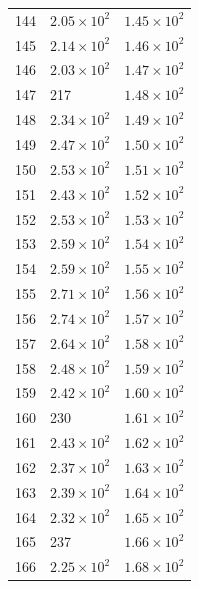 \begin{table}[H]
\begin{tabular}{lll}
144 & $\displaystyle 2.05 \times 10^{2}$ & $\displaystyle 1.45 \times 10^{2}$ \\
145 & $\displaystyle 2.14 \times 10^{2}$ & $\displaystyle 1.46 \times 10^{2}$ \\
146 & $\displaystyle 2.03 \times 10^{2}$ & $\displaystyle 1.47 \times 10^{2}$ \\
147 & 217 & $\displaystyle 1.48 \times 10^{2}$ \\
148 & $\displaystyle 2.34 \times 10^{2}$ & $\displaystyle 1.49 \times 10^{2}$ \\
149 & $\displaystyle 2.47 \times 10^{2}$ & $\displaystyle 1.50 \times 10^{2}$ \\
150 & $\displaystyle 2.53 \times 10^{2}$ & $\displaystyle 1.51 \times 10^{2}$ \\
151 & $\displaystyle 2.43 \times 10^{2}$ & $\displaystyle 1.52 \times 10^{2}$ \\
152 & $\displaystyle 2.53 \times 10^{2}$ & $\displaystyle 1.53 \times 10^{2}$ \\
153 & $\displaystyle 2.59 \times 10^{2}$ & $\displaystyle 1.54 \times 10^{2}$ \\
154 & $\displaystyle 2.59 \times 10^{2}$ & $\displaystyle 1.55 \times 10^{2}$ \\
155 & $\displaystyle 2.71 \times 10^{2}$ & $\displaystyle 1.56 \times 10^{2}$ \\
156 & $\displaystyle 2.74 \times 10^{2}$ & $\displaystyle 1.57 \times 10^{2}$ \\
157 & $\displaystyle 2.64 \times 10^{2}$ & $\displaystyle 1.58 \times 10^{2}$ \\
158 & $\displaystyle 2.48 \times 10^{2}$ & $\displaystyle 1.59 \times 10^{2}$ \\
159 & $\displaystyle 2.42 \times 10^{2}$ & $\displaystyle 1.60 \times 10^{2}$ \\
160 & 230 & $\displaystyle 1.61 \times 10^{2}$ \\
161 & $\displaystyle 2.43 \times 10^{2}$ & $\displaystyle 1.62 \times 10^{2}$ \\
162 & $\displaystyle 2.37 \times 10^{2}$ & $\displaystyle 1.63 \times 10^{2}$ \\
163 & $\displaystyle 2.39 \times 10^{2}$ & $\displaystyle 1.64 \times 10^{2}$ \\
164 & $\displaystyle 2.32 \times 10^{2}$ & $\displaystyle 1.65 \times 10^{2}$ \\
165 & 237 & $\displaystyle 1.66 \times 10^{2}$ \\
166 & $\displaystyle 2.25 \times 10^{2}$ & $\displaystyle 1.68 \times 10^{2}$ \\

\end{tabular}
\end{table}
